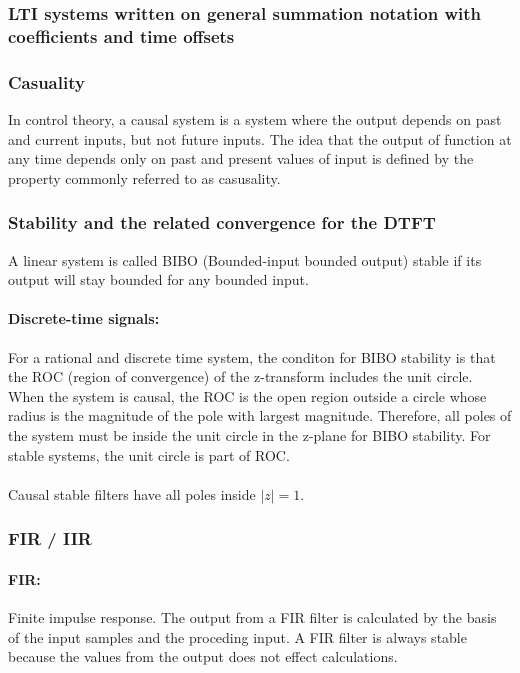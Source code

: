 \documentclass{article}
\begin{document}
\subsubsection{LTI systems written on general summation notation with coefficients and time offsets}

\subsubsection{Casuality}
In control theory, a causal system is a system where the output depends on past and current inputs, but not future inputs. The idea that the output of function at any time depends only on past and present values of input is defined by the property commonly referred to as casusality. 

\subsubsection{Stability and the related convergence for the DTFT}
A linear system is called BIBO (Bounded-input bounded output) stable if its output will stay bounded for any bounded input. 

\paragraph{Discrete-time signals:} For a rational and discrete time system, the conditon for BIBO stability  is that the ROC (region of convergence) of the z-transform includes the unit circle. When the system is causal, the ROC is the open region outside a circle whose radius is the magnitude of the pole with largest magnitude. Therefore, all poles of the system must be inside the unit circle in the z-plane for BIBO stability. For stable systems, the unit circle is part of ROC. 
\\
\\
Causal stable filters have all poles inside $|z| = 1$.

\subsubsection{FIR / IIR}
\paragraph{FIR:} Finite impulse response. The output from a FIR filter is calculated by the basis of the input samples and the proceding input. A FIR filter is always stable because the values from the output does not effect calculations. 
\end{document}
